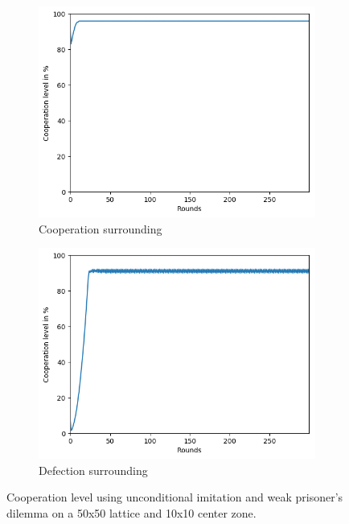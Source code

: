 \documentclass[letterpaper]{article}
\begin{document}
\begin{figure}[H]
    \begin{subfigure}{.5\textwidth}
        \centering
        \includegraphics[width=1\linewidth]{images/assign2/part31-coop/coop.png}
        \caption{Cooperation surrounding}
        \label{fig:part31-coop}
    \end{subfigure}
    \begin{subfigure}{.5\textwidth}
        \centering
        \includegraphics[width=1\linewidth]
        {images/assign2/part31-defect/coop.png}
        \caption{Defection surrounding}
        \label{fig:part31-defect}
    \end{subfigure}
    \caption{Cooperation level using unconditional imitation and
    weak prisoner's dilemma on a 50x50 lattice and 10x10 center zone.}
\end{figure}
\end{document}
